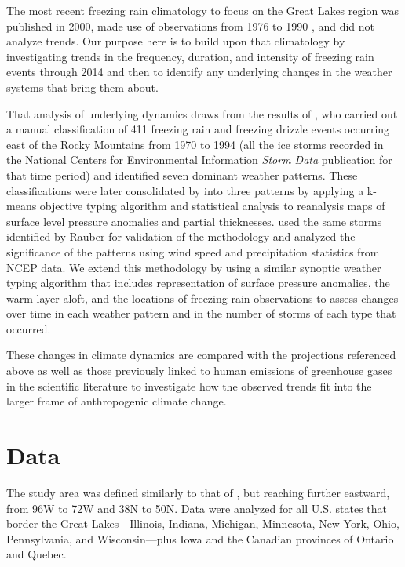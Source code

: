 \documentclass[twocol]{ametsoc}
\begin{document}
The most recent freezing rain climatology to focus on the Great Lakes region was published in 2000, made use of observations from 1976 to 1990 \citep{cortinas2000climatology}, and did not analyze trends. Our purpose here is to build upon that climatology by investigating trends in the frequency, duration, and intensity of freezing rain events through 2014 and then to identify any underlying changes in the weather systems that bring them about. 

That analysis of underlying dynamics draws from the results of \citet{rauber2001synoptic}, who carried out a manual classification of 411 freezing rain and freezing drizzle events occurring east of the Rocky Mountains from 1970 to 1994 (all the ice storms recorded in the National Centers for Environmental Information \textit{Storm Data} publication for that time period) and identified seven dominant weather patterns. These classifications were later consolidated by \citet{erfani2012automated} into three patterns by applying a k-means objective typing algorithm and statistical analysis to reanalysis maps of surface level pressure anomalies and partial thicknesses. \citet{erfani2012automated} used the same storms identified by Rauber for validation of the methodology and analyzed the significance of the patterns using wind speed and precipitation statistics from NCEP data. We extend this methodology by using a similar synoptic weather typing algorithm that includes representation of surface pressure anomalies, the warm layer aloft, and the locations of freezing rain observations to assess changes over time in each weather pattern and in the number of storms of each type that occurred.

These changes in climate dynamics are compared with the projections referenced above as well as those previously linked to human emissions of greenhouse gases in the scientific literature to investigate how the observed trends fit into the larger frame of anthropogenic climate change.


\section{Data}
The study area was defined similarly to that of \citet{cortinas2000climatology}, but reaching further eastward, from 96\degree W to 72\degree W and 38\degree N to 50\degree N. Data were analyzed for all U.S. states that border the Great Lakes---Illinois, Indiana, Michigan, Minnesota, New York, Ohio, Pennsylvania, and Wisconsin---plus Iowa and the Canadian provinces of Ontario and Quebec.
\end{document}

